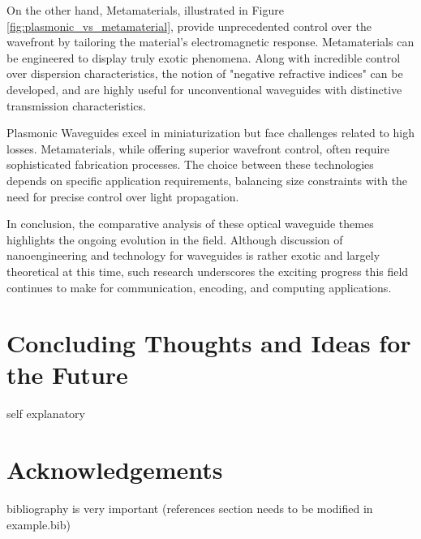 \documentclass[10pt]{article}
\begin{document}
On the other hand, Metamaterials, illustrated in Figure \ref{fig:plasmonic_vs_metamaterial}, provide unprecedented control over the wavefront by tailoring the material's electromagnetic response. 
Metamaterials can be engineered to display truly exotic phenomena. Along with incredible control over dispersion characteristics, the notion of "negative refractive indices" can be developed, and are highly 
useful for unconventional waveguides with distinctive transmission characteristics.



Plasmonic Waveguides excel in miniaturization but face challenges related to high losses. Metamaterials, while offering superior wavefront control, often require sophisticated fabrication processes. The choice between these technologies depends on specific application requirements, balancing size constraints with the need for precise control over light propagation.

In conclusion, the comparative analysis of these optical waveguide themes highlights the ongoing evolution in the field.
Although discussion of nanoengineering and technology for waveguides is rather exotic and largely theoretical at this time, 
such research underscores the exciting progress this field continues to make for communication, encoding, and computing applications.

\section{Concluding Thoughts and Ideas for the Future}

self explanatory 




\section{Acknowledgements}

bibliography is very important (references section needs to be modified in example.bib)

\end{document}
